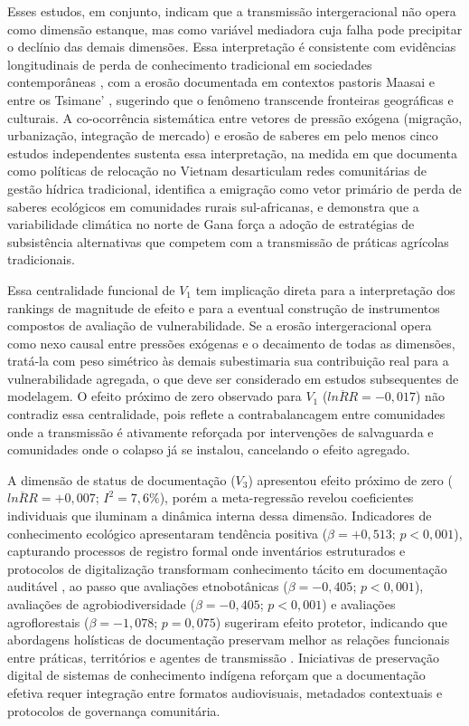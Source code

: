 \documentclass[12pt,a4paper]{article}
\begin{document}
Esses estudos, em conjunto, indicam que a transmissão intergeracional não opera como dimensão estanque, mas como variável mediadora cuja falha pode precipitar o declínio das demais dimensões. Essa interpretação é consistente com evidências longitudinais de perda de conhecimento tradicional em sociedades contemporâneas \citep{ReyesGarcia2013evidence}, com a erosão documentada em contextos pastoris Maasai \citep{HedgesKipila2020} e entre os Tsimane' \citep{Gruberg2022}, sugerindo que o fenômeno transcende fronteiras geográficas e culturais. A co-ocorrência sistemática entre vetores de pressão exógena (migração, urbanização, integração de mercado) e erosão de saberes em pelo menos cinco estudos independentes \citep{Tran2025,Moller2023,Bastos2022,VazquezDelfin2022,Aniah2019} sustenta essa interpretação, na medida em que \citet{Tran2025} documenta como políticas de relocação no Vietnam desarticulam redes comunitárias de gestão hídrica tradicional, \citet{Moller2023} identifica a emigração como vetor primário de perda de saberes ecológicos em comunidades rurais sul-africanas, e \citet{Aniah2019} demonstra que a variabilidade climática no norte de Gana força a adoção de estratégias de subsistência alternativas que competem com a transmissão de práticas agrícolas tradicionais.

Essa centralidade funcional de $V_1$ tem implicação direta para a interpretação dos rankings de magnitude de efeito e para a eventual construção de instrumentos compostos de avaliação de vulnerabilidade. Se a erosão intergeracional opera como nexo causal entre pressões exógenas e o decaimento de todas as dimensões, tratá-la com peso simétrico às demais subestimaria sua contribuição real para a vulnerabilidade agregada, o que deve ser considerado em estudos subsequentes de modelagem. O efeito próximo de zero observado para $V_1$ ($\overline{lnRR} = -0{,}017$) não contradiz essa centralidade, pois reflete a contrabalancagem entre comunidades onde a transmissão é ativamente reforçada por intervenções de salvaguarda e comunidades onde o colapso já se instalou, cancelando o efeito agregado.

A dimensão de status de documentação ($V_3$) apresentou efeito próximo de zero ($\overline{lnRR} = +0{,}007$; $I^2 = 7{,}6\%$), porém a meta-regressão revelou coeficientes individuais que iluminam a dinâmica interna dessa dimensão. Indicadores de conhecimento ecológico apresentaram tendência positiva ($\beta = +0{,}513$; $p < 0{,}001$), capturando processos de registro formal onde inventários estruturados e protocolos de digitalização transformam conhecimento tácito em documentação auditável \citep{Zeleke2025,Suwardi2025}, ao passo que avaliações etnobotânicas ($\beta = -0{,}405$; $p < 0{,}001$), avaliações de agrobiodiversidade ($\beta = -0{,}405$; $p < 0{,}001$) e avaliações agroflorestais ($\beta = -1{,}078$; $p = 0{,}075$) sugeriram efeito protetor, indicando que abordagens holísticas de documentação preservam melhor as relações funcionais entre práticas, territórios e agentes de transmissão \citep{Maina2012,Poorna2014}. Iniciativas de preservação digital de sistemas de conhecimento indígena \citep{Balogun2021} reforçam que a documentação efetiva requer integração entre formatos audiovisuais, metadados contextuais e protocolos de governança comunitária.
\end{document}
